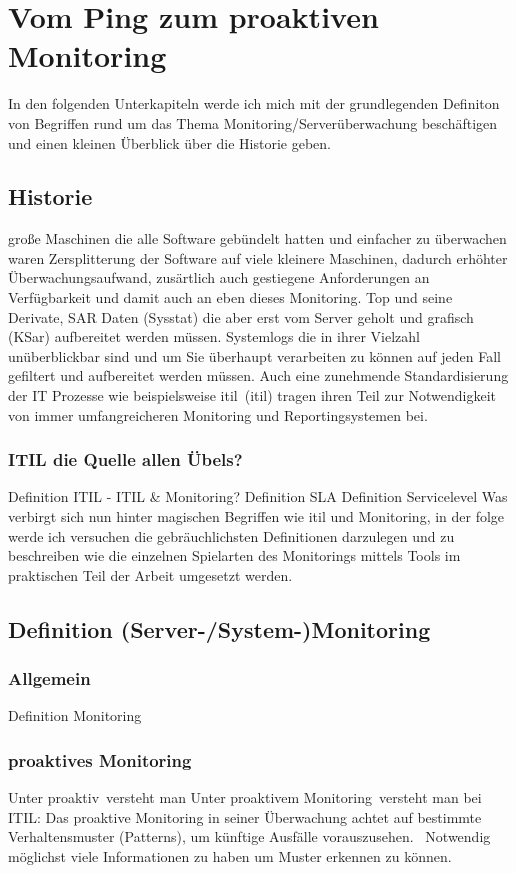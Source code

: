 \documentclass[12pt,a4paper,parskip]{scrreprt}
\begin{document}
	\chapter{Vom Ping zum proaktiven Monitoring}
	In den folgenden Unterkapiteln werde ich mich mit der grundlegenden Definiton von Begriffen rund um das Thema Monitoring/Serverüberwachung beschäftigen und einen kleinen Überblick über die Historie geben.
	\section{Historie}
	große Maschinen die alle Software gebündelt hatten und einfacher zu überwachen waren
	Zersplitterung der Software auf viele kleinere Maschinen, dadurch erhöhter Überwachungsaufwand, zusärtlich auch gestiegene Anforderungen an Verfügbarkeit und damit auch an eben dieses Monitoring.
	Top und seine Derivate, SAR Daten (Sysstat) die aber erst vom Server geholt und grafisch (KSar) aufbereitet werden müssen. Systemlogs die in ihrer Vielzahl unüberblickbar sind und um Sie überhaupt verarbeiten zu können auf jeden Fall gefiltert und aufbereitet werden müssen. Auch eine zunehmende Standardisierung der IT Prozesse wie beispielsweise \gls{itil}\ (\glsdesc{itil}) tragen ihren Teil zur Notwendigkeit von immer umfangreicheren Monitoring und Reportingsystemen bei.
	\subsection{ITIL die Quelle allen Übels?}
	Definition ITIL - ITIL \& Monitoring?
	Definition SLA
	Definition Servicelevel
	Was verbirgt sich nun hinter magischen Begriffen wie \gls{itil} und Monitoring, in der folge werde ich versuchen die gebräuchlichsten Definitionen darzulegen und zu beschreiben wie die einzelnen Spielarten des Monitorings mittels Tools im praktischen Teil der Arbeit umgesetzt werden.
	\section{Definition (Server-/System-)Monitoring}
	\subsection{Allgemein}
	Definition Monitoring
	\subsection{proaktives Monitoring}
	Unter \glqq proaktiv\grqq\ versteht man 
	Unter \glqq proaktivem Monitoring\grqq\ versteht man bei ITIL: \glqq Das proaktive Monitoring in seiner Überwachung achtet auf bestimmte Verhaltensmuster (Patterns), um künftige Ausfälle vorauszusehen. \grqq\ 
	Notwendig möglichst viele Informationen zu haben um Muster erkennen zu können.
\end{document}
